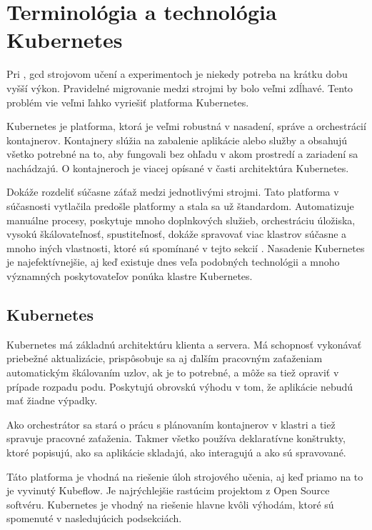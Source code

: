 

\chapter{Terminológia a technológia Kubernetes}

Pri , \acrfull{gcd} strojovom učení a experimentoch je niekedy potreba na krátku dobu vyšší výkon. Pravidelné migrovanie medzi strojmi by bolo veľmi zdĺhavé. Tento problém vie veľmi ľahko vyriešiť platforma Kubernetes.

Kubernetes je platforma, ktorá je veľmi robustná v nasadení, správe a orchestrácií kontajnerov. Kontajnery slúžia na zabalenie aplikácie alebo služby a obsahujú všetko potrebné na to, aby fungovali bez ohľadu v akom prostredí a zariadení sa nachádzajú. O kontajneroch je viacej opísané v časti architektúra Kubernetes.

Dokáže rozdeliť súčasne záťaž medzi jednotlivými strojmi. Tato platforma v súčasnosti vytlačila predošle platformy a stala sa už štandardom. Automatizuje manuálne procesy, poskytuje mnoho doplnkových služieb, orchestráciu úložiska, vysokú škálovateľnosť, spustiteľnosť, dokáže spravovať viac klastrov súčasne a mnoho iných vlastnosti, ktoré sú spomínané v tejto sekcií \cite{vlastnostikub}. Nasadenie Kubernetes je najefektívnejšie, aj keď existuje dnes veľa podobných technológii a mnoho významných poskytovateľov ponúka klastre Kubernetes.

\section{Kubernetes}
Kubernetes má základnú architektúru klienta a servera. Má schopnosť vykonávať priebežné aktualizácie, prispôsobuje sa aj ďalším pracovným zaťaženiam automatickým škálovaním uzlov, ak je to potrebné, a môže sa tiež opraviť v prípade rozpadu podu. Poskytujú obrovskú výhodu v tom, že aplikácie nebudú mať žiadne výpadky.

Ako orchestrátor sa stará o prácu s plánovaním kontajnerov v klastri a tiež spravuje pracovné zaťaženia. Takmer všetko používa deklaratívne konštrukty, ktoré popisujú, ako sa aplikácie skladajú, ako interagujú a ako sú spravované.

Táto platforma je vhodná na riešenie úloh strojového učenia, aj keď priamo na to je vyvinutý Kubeflow. Je najrýchlejšie rastúcim projektom z Open Source softvéru. Kubernetes je vhodný na riešenie hlavne kvôli výhodám, ktoré sú spomenuté v nasledujúcich podsekciách.

